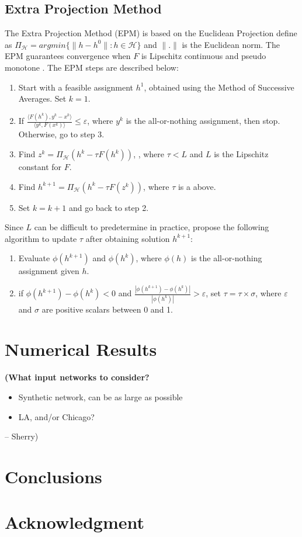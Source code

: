 \documentclass[conference]{IEEEtran}
\renewcommand{\:}{\mathrel{\coloneqq}}
\renewcommand{\=}{\ensuremath{\eqqcolon}}
\renewcommand{\epsilon}{\varepsilon}
\newcommand{\0}{\ensuremath{\boldsymbol{0}}}
\newcommand{\xslnote}[1]{{\bf\color{red}(#1 -- Sherry)}}
\begin{document}
\subsection{Extra Projection Method}
The Extra Projection Method (EPM) is based on the Euclidean Projection define as $\Pi_\mathcal{H} = argmin\{\lVert h-h^0\rVert:h \in\mathcal{H} \}$ and $\lVert.\rVert$ is the Euclidean norm. The EPM guarantees convergence when $F$ is Lipschitz continuous and pseudo monotone \cite{nie2010solving}. The EPM steps are described below:
\begin{enumerate}
\item Start with a feasible assignment $h^1$, obtained using the Method of Successive Averages. Set $k=1$.
\item If ${\frac {\langle F(h^k),y^k-x^k \rangle} {\langle y^k, F(x^k)\rangle}} \leq \epsilon$, where $y^k$ is the all-or-nothing assignment, then stop. Otherwise, go to step 3.
\item Find $z^k = \Pi_\mathcal{H}(h^k - \tau F(h^k))$, , where $\tau < L$ and $L$ is the Lipschitz constant for $F$.
\item Find $h^{k+1} = \Pi_\mathcal{H}(h^k - \tau F(z^k))$, where $\tau$ is a above.
\item Set $k = k+1$ and go back to step 2.
\end{enumerate}

Since $L$ can be difficult to predetermine in practice, \cite{nie2010solving} propose the following algorithm to update $\tau$ after obtaining solution $h^{k+1}$:
\begin{enumerate}
    \item Evaluate $\phi(h^{k+1})$ and $\phi(h^k)$, where $\phi(h)$ is the all-or-nothing assignment given $h$.
    \item if $\phi(h^{k+1})-\phi(h^k) < 0$ and $\frac{|\phi(h^{k+1})-\phi(h^k)|}{|\phi(h^k)|}> \epsilon$, set $\tau = \tau \times \sigma$, where $\epsilon$ and $\sigma$ are positive scalars between 0 and 1.
\end{enumerate}

\section{Numerical Results}

\xslnote{What input networks to consider?
\begin{itemize}
\item Synthetic network, can be as large as possible
\item LA, and/or Chicago?
\end{itemize}
}

\section{Conclusions}\label{sec:concl}

\section*{Acknowledgment}




\end{document}
